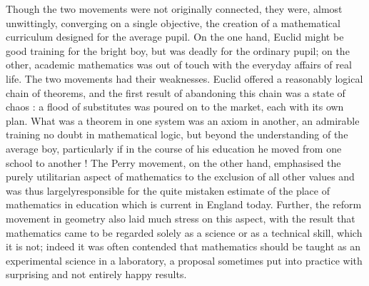 Though the two movements were not originally connected, they were, almost unwittingly, converging on a single objective, the creation of a mathematical curriculum designed for the average pupil. On the one hand, Euclid might be good training for the bright boy, but was deadly for the ordinary pupil; on the other, academic mathematics was out of touch with the everyday affairs of real life. The two movements had their weaknesses. Euclid offered a reasonably logical chain of theorems, and the first result of abandoning this chain was a state of chaos : a flood of substitutes was poured on to the market, each with its own plan. What was a theorem in one system was an axiom in another, an admirable training no doubt in mathematical logic, but beyond the understanding of the average boy, particularly if in the course of his education he moved from one school to another ! The Perry movement, on the other hand, emphasised the purely utilitarian aspect of mathematics to the exclusion of all other values and was thus largely\pageoriginale responsible for the quite mistaken estimate of the place of mathematics in education which is current in England today. Further, the reform movement in geometry also laid much stress on this aspect, with the result that mathematics came to be regarded solely as a science or as a technical skill, which it is not; indeed it was often contended that mathematics should be taught as an experimental science in a laboratory, a proposal sometimes put into practice with surprising and not entirely happy results.

